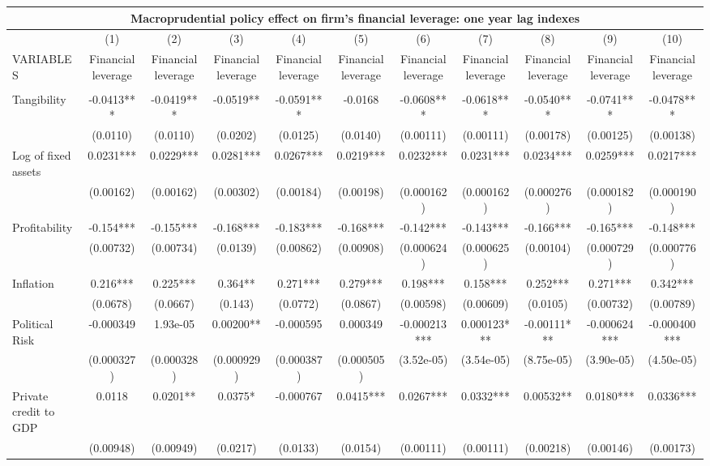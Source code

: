 \begin{tabular}{lcccccccccc}
\multicolumn{11}{c}{Macroprudential policy effect on firm's financial leverage: one year lag indexes} \\ \hline
 & (1) & (2) & (3) & (4) & (5) & (6) & (7) & (8) & (9) & (10) \\
VARIABLES & Financial leverage & Financial leverage & Financial leverage & Financial leverage & Financial leverage & Financial leverage & Financial leverage & Financial leverage & Financial leverage & Financial leverage \\ \hline
 &  &  &  &  &  &  &  &  &  &  \\
Tangibility & -0.0413*** & -0.0419*** & -0.0519** & -0.0591*** & -0.0168 & -0.0608*** & -0.0618*** & -0.0540*** & -0.0741*** & -0.0478*** \\
 & (0.0110) & (0.0110) & (0.0202) & (0.0125) & (0.0140) & (0.00111) & (0.00111) & (0.00178) & (0.00125) & (0.00138) \\
Log of fixed assets & 0.0231*** & 0.0229*** & 0.0281*** & 0.0267*** & 0.0219*** & 0.0232*** & 0.0231*** & 0.0234*** & 0.0259*** & 0.0217*** \\
 & (0.00162) & (0.00162) & (0.00302) & (0.00184) & (0.00198) & (0.000162) & (0.000162) & (0.000276) & (0.000182) & (0.000190) \\
Profitability & -0.154*** & -0.155*** & -0.168*** & -0.183*** & -0.168*** & -0.142*** & -0.143*** & -0.166*** & -0.165*** & -0.148*** \\
 & (0.00732) & (0.00734) & (0.0139) & (0.00862) & (0.00908) & (0.000624) & (0.000625) & (0.00104) & (0.000729) & (0.000776) \\
Inflation & 0.216*** & 0.225*** & 0.364** & 0.271*** & 0.279*** & 0.198*** & 0.158*** & 0.252*** & 0.271*** & 0.342*** \\
 & (0.0678) & (0.0667) & (0.143) & (0.0772) & (0.0867) & (0.00598) & (0.00609) & (0.0105) & (0.00732) & (0.00789) \\
Political Risk & -0.000349 & 1.93e-05 & 0.00200** & -0.000595 & 0.000349 & -0.000213*** & 0.000123*** & -0.00111*** & -0.000624*** & -0.000400*** \\
 & (0.000327) & (0.000328) & (0.000929) & (0.000387) & (0.000505) & (3.52e-05) & (3.54e-05) & (8.75e-05) & (3.90e-05) & (4.50e-05) \\
Private credit to GDP & 0.0118 & 0.0201** & 0.0375* & -0.000767 & 0.0415*** & 0.0267*** & 0.0332*** & 0.00532** & 0.0180*** & 0.0336*** \\
 & (0.00948) & (0.00949) & (0.0217) & (0.0133) & (0.0154) & (0.00111) & (0.00111) & (0.00218) & (0.00146) & (0.00173) \\

\end{tabular}
